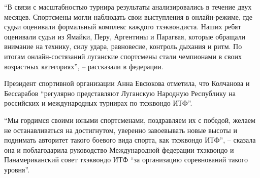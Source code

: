 \enquote{В связи с масштабностью турнира результаты анализировались в течение двух
месяцев. Спортсмены могли наблюдать свои выступления в онлайн-режиме, где судьи
оценивали формальный комплекс каждого тхэквондиста. Наших ребят оценивали судьи
из Ямайки, Перу, Аргентины и Парагвая, которые обращали внимание на технику,
силу удара, равновесие, контроль дыхания и ритм. По итогам онлайн-состязаний
луганские спортсмены стали чемпионами в своих возрастных категориях}, –
рассказали в федерации.

Президент спортивной организации Анна Евсюкова отметила, что Колчанова и
Бессарабов \enquote{регулярно представляют Луганскую Народную Республику на российских
и международных турнирах по тхэквондо ИТФ}.

\enquote{Мы гордимся своими юными спортсменами, поздравляем их с победой, желаем не
останавливаться на достигнутом, уверенно завоевывать новые высоты и поднимать
авторитет такого боевого вида спорта, как тхэквондо ИТФ}, – сказала она и
поблагодарила руководство Международной федерации тхэквондо и Панамериканский
совет тхэквондо ИТФ \enquote{за организацию соревнований такого уровня}.
